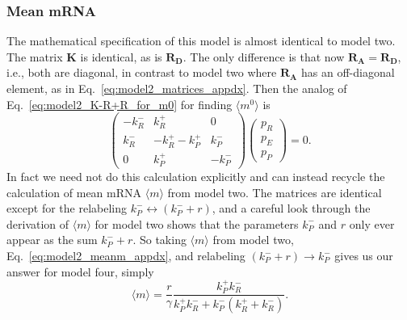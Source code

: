 \subsubsection{Mean mRNA}
The mathematical specification of this model is almost identical to model two.
The matrix $\mathbf{K}$ is identical, as is $\mathbf{R_D}$. The only difference
is that now $\mathbf{R_A}=\mathbf{R_D}$, i.e., both are diagonal, in contrast to
model two where $\mathbf{R_A}$ has an off-diagonal element, as in
Eq.~\ref{eq:model2_matrices_appdx}. Then the analog of
Eq.~\ref{eq:model2_K-R+R_for_m0} for finding $\langle{m}^0\rangle$ is
\begin{equation}
\begin{pmatrix} -k_R^- & k_R^+ & 0 \\
        k_R^- & -k_R^+ -k_P^+ & k_P^-\\
        0 & k_P^+ & -k_P^-
\end{pmatrix}
\begin{pmatrix}
    p_R \\ p_E \\ p_P
\end{pmatrix}
= 0.
\end{equation}
In fact we need not do this calculation explicitly and can instead recycle the
calculation of mean mRNA $\langle{m}\rangle$ from model two. The matrices are
identical except for the relabeling $k_P^- \longleftrightarrow (k_P^- + r)$, and
a careful look through the derivation of $\langle{m}\rangle$ for model two shows
that the parameters $k_P^-$ and $r$ only ever appear as the sum $k_P^- + r$. So
taking $\langle{m}\rangle$ from model two, Eq.~\ref{eq:model2_meanm_appdx}, and
relabeling $(k_P^- + r) \rightarrow k_P^-$ gives us our answer for model four,
simply
\begin{equation}
\langle{m}\rangle = \frac{r}{\gamma}
        \frac{k_P^+ k_R^-} {k_P^+ k_R^- + k_P^- (k_R^+ + k_R^-)}.
\end{equation}

